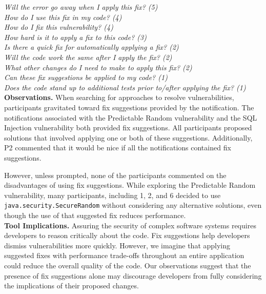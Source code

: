 \documentclass[conference]{IEEEtran}
\begin{document}
\noindent\emph{Will the error go away when I apply this fix? (5)} \\
\emph{How do I use this fix in my code? (4)} \\
\emph{How do I fix this vulnerability? (4)} \\
\emph{How hard is it to apply a fix to this code? (3)} \\
\emph{Is there a quick fix for automatically applying a fix? (2)} \\
\emph{Will the code work the same after I apply the fix? (2)} \\
\emph{What other changes do I need to make to apply this fix? (2)} \\
\emph{Can these fix suggestions be applied to my code? (1)} \\
\emph{Does the code stand up to additional tests prior to/after applying the fix? (1)} \\


\noindent\textbf{Observations.}
When searching for approaches to resolve vulnerabilities, participants gravitated toward fix suggestions provided by the notification.
The notifications associated with the Predictable Random vulnerability and the SQL Injection vulnerability both provided fix suggestions.
All participants proposed solutions that involved applying one or both of these suggestions. 
Additionally, P2 commented that it would be nice if all the notifications contained fix suggestions.

However, unless prompted, none of the participants commented on the disadvantages of using fix suggestions.
While exploring the Predictable Random vulnerability, many participants, including 1, 2, and 6 decided to use \texttt{java.security.SecureRandom} without considering any alternative solutions, even though the use of that suggested fix reduces performance.
\\


\noindent\textbf{Tool Implications.}
Assuring the security of complex software systems requires developers to reason critically about the code. 
Fix suggestions help developers dismiss vulnerabilities more quickly.
However, we imagine that applying suggested fixes with performance trade-offs throughout an entire application could reduce the overall quality of the code.
Our observations suggest that the presence of fix suggestions alone may discourage developers from fully considering the implications of their proposed changes.
\end{document}
